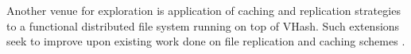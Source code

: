 \documentclass[10pt, conference, letterpaper]{IEEEtran}
\begin{document}
Another venue for exploration is application of caching and replication strategies to a functional distributed file system running on top of VHash.  Such extensions seek to improve upon existing work done on file replication and caching schemes \cite{shen2010irm}.







\end{document}
